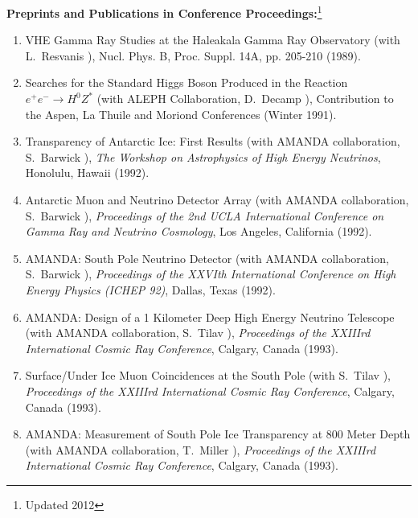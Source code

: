 {\bf Preprints and Publications in Conference Proceedings:}\footnote{Updated 2012}
\vspace{0.25cm}

\begin{enumerate}
\item    VHE Gamma Ray Studies at the Haleakala Gamma Ray Observatory
         (with L.~Resvanis \etal), Nucl. Phys. B, Proc. Suppl. 14A,
         pp. 205-210 (1989).

\item    Searches for the Standard Higgs Boson Produced in the Reaction
         ${e^+}{e^-} \rightarrow H^0 Z^*$
         (with ALEPH Collaboration, D.~Decamp \etal),
         Contribution to the Aspen, La Thuile and Moriond Conferences
         (Winter 1991).

\item    Transparency of Antarctic Ice: First Results
         (with AMANDA collaboration, S.~Barwick 
         \etal), 
         {\it The Workshop on
         Astrophysics of High Energy Neutrinos}, Honolulu, Hawaii (1992).

\item    Antarctic Muon and Neutrino Detector Array
         (with AMANDA collaboration, S.~Barwick \etal),
         {\it Proceedings of the 
         2nd UCLA International Conference on Gamma Ray and Neutrino 
         Cosmology}, Los Angeles, California (1992).

\item    AMANDA: South Pole Neutrino Detector
         (with AMANDA collaboration, S.~Barwick \etal),
         {\it Proceedings of the 
         XXVIth International Conference on High Energy Physics 
         (ICHEP 92)}, Dallas, Texas (1992).

\item    AMANDA: Design of a 1 Kilometer Deep High Energy Neutrino 
         Telescope (with AMANDA collaboration, S.~Tilav \etal),
         {\it Proceedings of the 
         XXIIIrd International Cosmic Ray Conference}, Calgary, Canada
         (1993).

\item    Surface/Under Ice Muon Coincidences at the South Pole
         (with S.~Tilav \etal),
         {\it Proceedings of the 
         XXIIIrd International Cosmic Ray Conference}, Calgary, Canada
         (1993).

\item    AMANDA: Measurement of South Pole Ice Transparency at 800 
         Meter Depth (with AMANDA collaboration, T.~Miller \etal),
         {\it Proceedings of the 
         XXIIIrd International Cosmic Ray Conference}, Calgary, Canada
         (1993).


\end{enumerate}
